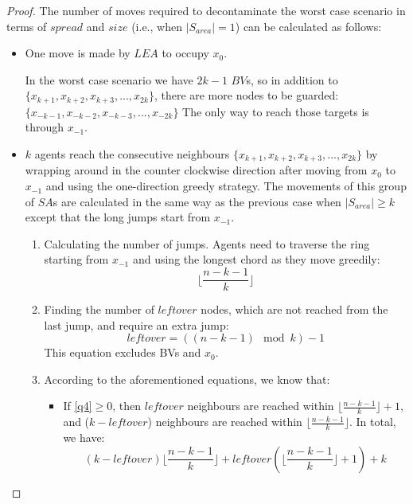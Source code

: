 \begin{proof}
The number of moves required to decontaminate the worst case scenario in terms of $spread$ and $size$ (i.e., when $|S_{area}|=1$) can be calculated as follows:
\begin{itemize}
\item One move is made by $LEA$ to occupy $x_{0}$.

In the worst case scenario we have $2k-1$ $BV$s, so in addition to $\{x_{k+1},x_{k+2},x_{k+3},...,x_{2k}\}$, there are more nodes to be guarded: $\{x_{-k-1},x_{-k-2},x_{-k-3},...,x_{-2k}\}$ The only way to reach those targets is through $x_{-1}$.

\item $k$ agents reach the  consecutive neighbours $\{x_{k+1},x_{k+2},x_{k+3},...,x_{2k}\}$ by wrapping around in the counter clockwise direction after moving from $x_{0}$ to $x_{-1}$ and using the one-direction greedy strategy. The movements of this group of  $SA$s are calculated in the same way as the previous case when $|S_{area}|\ge k$ except that the long jumps start from $x_{-1}$.




\begin{enumerate}
  \item Calculating the number of jumps. Agents need to traverse the ring starting from $x_{-1}$ and using the longest chord as they move greedily: \begin{equation}\label{q3}
\lfloor \frac {n-k-1}{k} \rfloor 
\end {equation}
  \item Finding the number of $leftover$ nodes, which are not reached from the last jump, and require an extra jump:
 \begin{equation}\label{q4}
leftover=((n-k-1)\mod k ) -1 
\end {equation}   
This equation excludes BVs and $x_{0}$.
  
  \item According to the aforementioned equations, we know that: 
\begin{itemize}

\item If \ref{q4}$\ge 0$, then $leftover$  neighbours are reached within $\lfloor \frac {n-k-1}{k} \rfloor  +1$,  
and ($k- leftover$) neighbours are reached within $\lfloor \frac {n-k-1}{k} \rfloor  $. In total, we have:\\
$$(k- leftover) \lfloor \frac {n-k-1}{k} \rfloor + leftover (\lfloor \frac {n-k-1}{k} \rfloor  +1)+k$$


\end{itemize}
\end{enumerate}
\end{itemize}
\end{proof}
